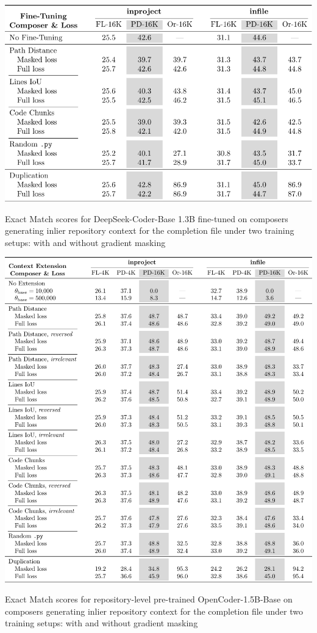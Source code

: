 \begin{table}[htbp]
    \centering
    \includegraphics[width=\textwidth]{tables/rq-a2-gradient-masking.pdf}
    \caption{Exact Match scores for DeepSeek-Coder-Base 1.3B fine-tuned on composers generating inlier repository context for the completion file under two training setups: with and without gradient masking}\label{tab:dseek-gradient-masking}
\end{table}

\begin{table}[htbp]
    \centering
    \includegraphics[width=\textwidth]{tables/rq-b-gradient-masking.pdf}
    \caption{Exact Match scores for repository-level pre-trained OpenCoder-1.5B-Base on composers generating inlier repository context for the completion file under two training setups: with and without gradient masking}\label{tab:ocoder-gradient-masking}
\end{table}

